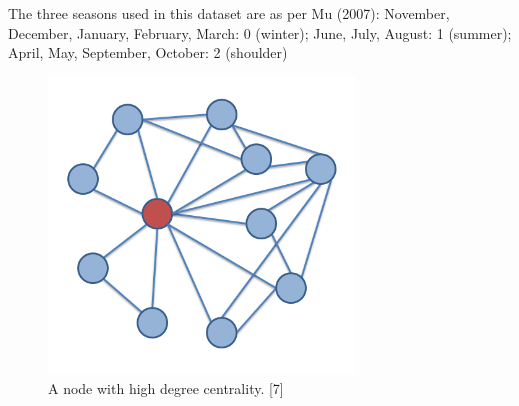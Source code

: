 \documentclass[conference,letterpaper]{IEEEtran}
\begin{document}
The three seasons used in this dataset are as per Mu (2007): 
November, December, January, February, March: 0 (winter); 
June, July, August: 1 (summer); 
April, May, September, October: 2 (shoulder) \\

\begin{center}
\begin{figure}[hb]
\centering
\includegraphics[width=3.2in]{ego_network}
\caption{
A node with high degree centrality. [7]
}
\label{fig_sim}
\end{figure}
\end{center}
\end{document}
